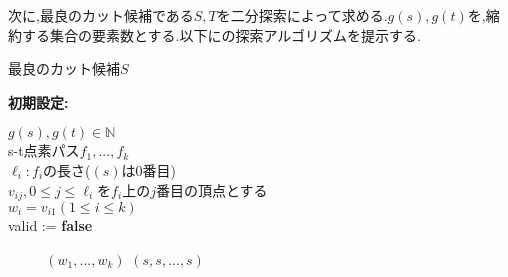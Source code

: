 \documentclass{thesis}
\theoremstyle{definition}
\begin{document}
次に,最良のカット候補である$S,T$を二分探索によって求める.$g(s),g(t)$を,縮約する集合の要素数とする.以下に\cite{brandt2017approximating}の探索アルゴリズムを提示する.

\begin{algorithm}[H]
    \caption{最良のカット候補$S$} 
    \textbf{初期設定:} \par
    $g(s),g(t)\in \mathbb{N}$ \\
    s-t点素パス$f_1,...,f_k$ \\
    $\ell_i:f_i$の長さ($(s)$は0番目) \\
    $v_{ij},0 \leq j \leq \ell_i$を$f_i$上の$j$番目の頂点とする \\
    $w_i=v_{i1}(1\leq i \leq k)$ \\
    valid := \textbf{false} \\
    {\setlength{\baselineskip}{12pt}
    \begin{algorithmic}[1]
         
         
             
             
            \Else
            \EndIf　
        \EndWhile　
      \EndFor
       $(w_1,...,w_k)$
      \Else
       $(s,s,...,s)$
      \EndIf
    \end{algorithmic}
    }
\end{algorithm}
\end{document}
